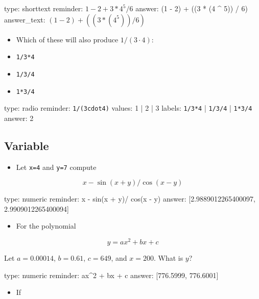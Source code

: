 \documentclass[12pt]{article}
\begin{document}
\begin{answer}
type: shorttext
reminder: \( 1 - 2 + 3 * 4 ^ 5 / 6 \)
answer: (1 - 2) + ((3 * (4 ^ 5)) / 6)
answer_text: \( (1 - 2) + ((3 * (4 ^ 5)) / 6) \) 
\end{answer}

\begin{itemize}
\item
  Which of these will also produce $1/(3\cdot4)$:
\item
  \texttt{1/3*4}
\item
  \texttt{1/3/4}
\item
  \texttt{1*3/4}
\end{itemize}

\begin{answer}
type: radio
reminder: \verb+1/(3cdot4)+
values: 1 | 2 | 3
labels: \verb+1/3*4+ | \verb+1/3/4+ | \verb+1*3/4+
answer: 2
\end{answer}

\subsection{Variable}

\begin{itemize}
\itemsep1pt\parskip0pt
\item
  Let \texttt{x=4} and \texttt{y=7} compute
\end{itemize}

\[
x - \sin(x + y)/\cos(x - y)
\]

\begin{answer}
    type: numeric
    reminder: x - sin(x + y)/ cos(x - y)
    answer: [2.9889012265400097, 2.9909012265400094]

\end{answer}

\begin{itemize}
\itemsep1pt\parskip0pt
\item
  For the polynomial
\end{itemize}

\[
y = ax^2 + bx + c
\]

Let $a=0.00014$, $b=0.61$, $c=649$, and $x=200$. What is $y$?

\begin{answer}
    type: numeric
    reminder: ax^2 + bx + c
    answer: [776.5999, 776.6001]

\end{answer}

\begin{itemize}
\itemsep1pt\parskip0pt
\item
  If
\end{itemize}
\end{document}

